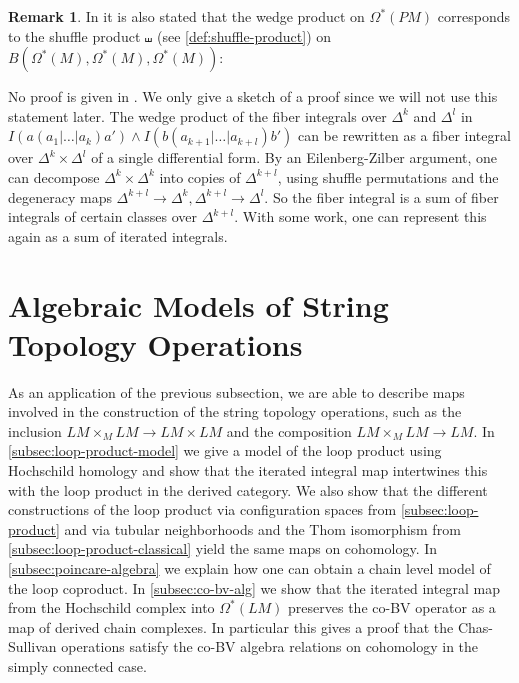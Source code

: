 \documentclass{scrartcl}
\theoremstyle{plain}
\theoremstyle{definition}
\newtheorem{remark}[theorem]{Remark}
\begin{document}
\begin{remark}
    In \cite{naef2019string} it is also stated that the wedge product on $\Omega^*(PM)$ corresponds to the shuffle product $\shuffle$ (see \cref{def:shuffle-product}) on $B(\Omega^*(M), \Omega^*(M), \Omega^*(M))$:
    \begin{center}
    \end{center}

    No proof is given in \cite{naef2019string}. We only give a sketch of a proof since we will not use this statement later. The wedge product of the fiber integrals over $\Delta^k$ and $\Delta^l$ in $I(a(a_1|\dots|a_k)a') \wedge I(b(a_{k+1}|\dots|a_{k+l})b')$ can be rewritten as a fiber integral over $\Delta^k\times\Delta^l$ of a single differential form. By an Eilenberg-Zilber argument, one can decompose $\Delta^{k}\times\Delta^k$ into copies of $\Delta^{k+l}$, using shuffle permutations and the degeneracy maps $\Delta^{k+l}\to \Delta^k, \Delta^{k+l}\to \Delta^l$. So the fiber integral is a sum of fiber integrals of certain classes over $\Delta^{k+l}$. With some work, one can represent this again as a sum of iterated integrals.
\end{remark}





\section{Algebraic Models of String Topology Operations}\label{sec:loop-models}
As an application of the previous subsection, we are able to describe maps involved in the construction of the string topology operations, such as the inclusion $LM\times_M LM\to LM\times LM$ and the composition $LM\times_M LM\to LM$. In \cref{subsec:loop-product-model} we give a model of the loop product using Hochschild homology and show that the iterated integral map intertwines this with the loop product in the derived category. We also show that the different constructions of the loop product via configuration spaces from \cref{subsec:loop-product} and via tubular neighborhoods and the Thom isomorphism from \cref{subsec:loop-product-classical} yield the same maps on cohomology. In \cref{subsec:poincare-algebra} we explain how one can obtain a chain level model of the loop coproduct. In \cref{subsec:co-bv-alg} we show that the iterated integral map from the Hochschild complex into $\Omega^*(LM)$ preserves the co-BV operator as a map of derived chain complexes. In particular this gives a proof that the Chas-Sullivan operations satisfy the co-BV algebra relations  on cohomology in the simply connected case. 
\end{document}
